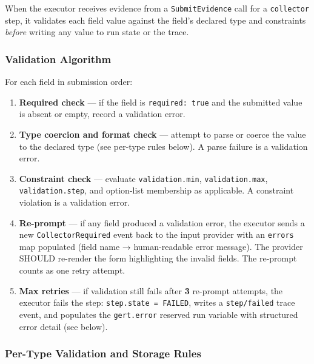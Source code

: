 When the executor receives evidence from a \texttt{SubmitEvidence} call for a
\texttt{collector} step, it validates each field value against the field's declared type
and constraints \emph{before} writing any value to run state or the trace.

\subsubsection*{Validation Algorithm}

For each field in submission order:

\begin{enumerate}
  \item \textbf{Required check} — if the field is \texttt{required: true} and the
        submitted value is absent or empty, record a validation error.
  \item \textbf{Type coercion and format check} — attempt to parse or coerce the value
        to the declared type (see per-type rules below). A parse failure is a validation
        error.
  \item \textbf{Constraint check} — evaluate \texttt{validation.min},
        \texttt{validation.max}, \texttt{validation.step}, and option-list membership as
        applicable. A constraint violation is a validation error.
  \item \textbf{Re-prompt} — if any field produced a validation error, the executor sends
        a new \texttt{CollectorRequired} event back to the input provider with an
        \texttt{errors} map populated (field name → human-readable error message). The
        provider SHOULD re-render the form highlighting the invalid fields. The re-prompt
        counts as one retry attempt.
  \item \textbf{Max retries} — if validation still fails after \textbf{3} re-prompt
        attempts, the executor fails the step: \texttt{step.state = FAILED}, writes a
        \texttt{step/failed} trace event, and populates the \texttt{gert.error} reserved
        run variable with structured error detail (see below).
\end{enumerate}

\subsubsection*{Per-Type Validation and Storage Rules}

